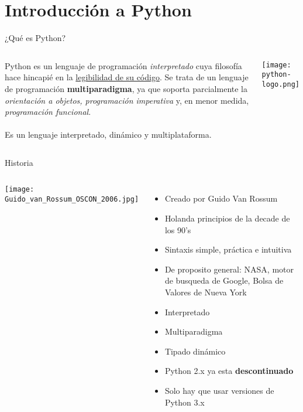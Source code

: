 
\section{Introducción a Python}

\begin{frame}[c]{¿Qué es Python?}
    \begin{columns}
        Python es un lenguaje de programación \textit{interpretado} cuya
        filosofía hace hincapié en la \underline{legibilidad de su código}.
        Se trata de un lenguaje de programación \textbf{multiparadigma}, ya
        que soporta parcialmente la \textit{orientación a objetos,
        programación imperativa} y, en menor medida, \textit{programación
        funcional}. \\~\\

        Es un lenguaje interpretado, dinámico y multiplataforma. 
        \begin{center}
            \texttt{[image: python-logo.png]}
        \end{center}
    \end{columns}
\end{frame}

\begin{frame}[c]{Historia}
  \begin{columns}
        \begin{center}
            \texttt{[image: Guido\_van\_Rossum\_OSCON\_2006.jpg]}
        \end{center}
    \begin{itemize}
      \item Creado por Guido Van Rossum
      \pausa
      \item Holanda principios de la decade de los 90's
      \pausa
      \item Sintaxis simple, práctica e intuitiva
      \pausa
      \item De proposito general: NASA, motor de busqueda de Google, Bolsa de
        Valores de Nueva York
      \pausa
      \item Interpretado
      \pausa
      \item Multiparadigma
      \pausa
      \item Tipado dinámico
      \pausa
      \item Python 2.x ya esta \textbf{descontinuado}
      \pausa
      \item Solo hay que usar versiones de Python 3.x
    \end{itemize}
  \end{columns}
\end{frame}

